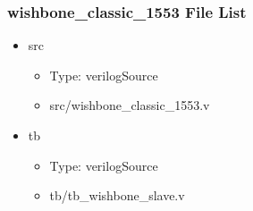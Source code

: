 \subsubsection{wishbone\_classic\_1553 File List}
\begin{itemize}
\item src
	\begin{itemize}
	\item[$\space$] Type: verilogSource
	\item src/wishbone\_classic\_1553.v
	\end{itemize}
\item tb
	\begin{itemize}
	\item[$\space$] Type: verilogSource
	\item tb/tb\_wishbone\_slave.v
	\end{itemize}
\end{itemize}
